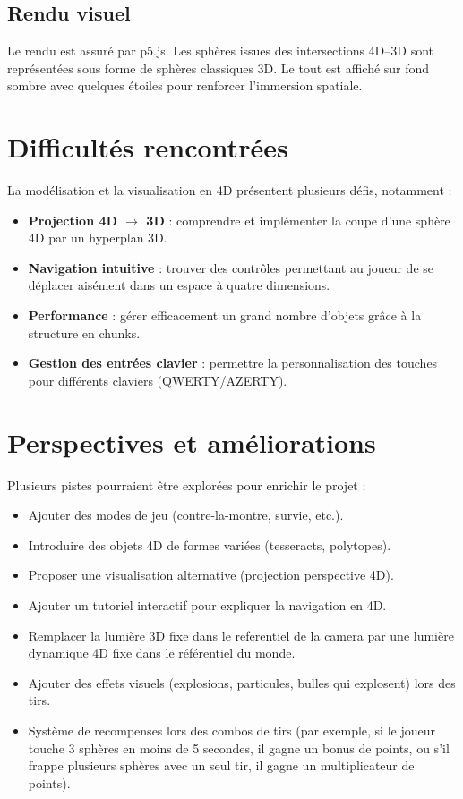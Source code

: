 \documentclass[11pt,a4paper]{article}
\begin{document}
\subsection{Rendu visuel}

Le rendu est assuré par p5.js. Les sphères issues des intersections 4D–3D sont représentées sous forme de sphères classiques 3D. Le tout est affiché sur fond sombre avec quelques étoiles pour renforcer l’immersion spatiale.



\section{Difficultés rencontrées}

La modélisation et la visualisation en 4D présentent plusieurs défis, notamment :
\begin{itemize}
    \item \textbf{Projection 4D $\rightarrow$ 3D} : comprendre et implémenter la coupe d'une sphère 4D par un hyperplan 3D.
    \item \textbf{Navigation intuitive} : trouver des contrôles permettant au joueur de se déplacer aisément dans un espace à quatre dimensions.
    \item \textbf{Performance} : gérer efficacement un grand nombre d'objets grâce à la structure en chunks.
    \item \textbf{Gestion des entrées clavier} : permettre la personnalisation des touches pour différents claviers (QWERTY/AZERTY).
\end{itemize}

\section{Perspectives et améliorations}

Plusieurs pistes pourraient être explorées pour enrichir le projet :
\begin{itemize}
    \item Ajouter des modes de jeu (contre-la-montre, survie, etc.).
    \item Introduire des objets 4D de formes variées (tesseracts, polytopes).
    \item Proposer une visualisation alternative (projection perspective 4D).
    \item Ajouter un tutoriel interactif pour expliquer la navigation en 4D.
    \item Remplacer la lumière 3D fixe dans le referentiel de la camera par une lumière dynamique 4D fixe dans le référentiel du monde.
    \item Ajouter des effets visuels (explosions, particules, bulles qui explosent) lors des tirs.
    \item Système de recompenses lors des combos de tirs (par exemple, si le joueur touche 3 sphères en moins de 5 secondes, il gagne un bonus de points, ou s'il frappe plusieurs sphères avec un seul tir, il gagne un multiplicateur de points).
\end{itemize}
\end{document}
